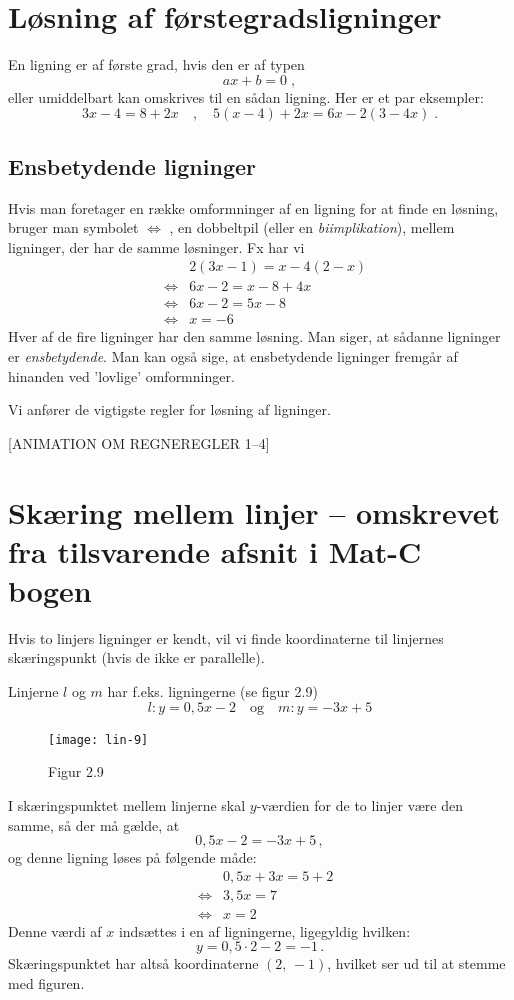 \documentclass[12pt,oneside,a4paper]{article}
\newcommand{\bas}{\begin{eqnarray*}}
\newcommand{\eas}{\end{eqnarray*}}
\begin{document}

\section{Løsning af førstegradsligninger}
En ligning er af første grad, hvis den er af typen
$$
ax + b = 0\; ,
$$
eller umiddelbart kan omskrives til en sådan ligning. Her er et par eksempler:
$$
3x - 4 = 8 + 2x \quad , \quad 5(x - 4) + 2x = 6x - 2(3 - 4x)\; .
$$

\subsection{Ensbetydende ligninger}
Hvis man foretager en række omformninger af en ligning for at finde en løsning,
bruger man symbolet $\Leftrightarrow$ , en dobbeltpil (eller en {\em biimplikation}), mellem
ligninger, der har de samme løsninger. Fx har vi
\bas
&& 2(3x - 1) = x - 4(2 - x)\\
&\Leftrightarrow& 6x - 2 = x - 8 + 4x\\
&\Leftrightarrow& 6x - 2 = 5x - 8 \\
&\Leftrightarrow& x = -6 
\eas
Hver af de fire ligninger har den samme løsning. Man siger, at sådanne
ligninger er {\em ensbetydende}. Man kan også sige, at ensbetydende ligninger fremgår
af hinanden ved ’lovlige’ omformninger.

Vi anfører de vigtigste regler for løsning af ligninger.

[ANIMATION OM REGNEREGLER 1--4]



\section{Skæring mellem linjer -- omskrevet fra tilsvarende afsnit i Mat-C bogen}
Hvis to linjers ligninger er kendt, vil vi finde koordinaterne til linjernes
skæringspunkt (hvis de ikke er parallelle).

Linjerne $l$ og $m$ har f.eks. ligningerne (se figur 2.9)
\[
    l: y=0,5x-2\quad{\mbox{og}}\quad m: y=-3x+5
\]

\begin{figure}[H]
    \centering
    \texttt{[image: lin-9]}
    \caption{Figur 2.9}
    \label{fig6}
\end{figure}

I skæringspunktet mellem linjerne skal $y$-værdien for de to linjer være den
samme, så der må gælde, at
\[
0,5x-2 = -3x+5 \,,
\]
og denne ligning løses på følgende måde:
\bas
&& 0,5x+3x=5+2\\
&\iff& 3,5x=7\\
&\iff& x=2
\eas
Denne værdi af $x$ indsættes i en af ligningerne, ligegyldig hvilken:
\[
y=0,5\cdot2-2=-1 \,.
\]
Skæringspunktet har altså koordinaterne $(2,\,-1)$, hvilket ser ud til at
stemme med figuren.
\end{document}
